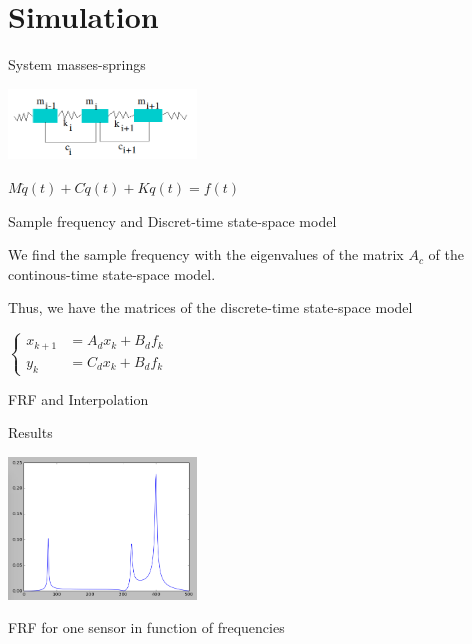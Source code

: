 \documentclass{beamer}
\begin{document}
\section{Simulation}

\begin{frame}{System masses-springs}
\begin{center}
\includegraphics[width=5cm]{images/ressorts.png}

$M \ddot{q}(t) + C \dot{q}(t) + K q(t) = f(t)$
\end{center}




\end{frame}


\begin{frame}{Sample frequency and Discret-time state-space model}

We find the sample frequency with the eigenvalues of the matrix $A_c$ of the continous-time state-space model.

\vspace{5mm}

Thus, we have the matrices of the discrete-time state-space model
\begin{center}
$\left\{
\begin{array}{ll}
x_{k+1} & = A_dx_k + B_df_k \\
y_k & = C_dx_k + B_df_k
\end{array}
\right.$
\end{center}

\end{frame}

\begin{frame}{FRF and Interpolation}
\end{frame}

\begin{frame}{Results}
\begin{center}
\includegraphics[width=5cm]{images/FRF_freq.png}

FRF for one sensor in function of frequencies
\end{center}
\end{frame}
\end{document}
